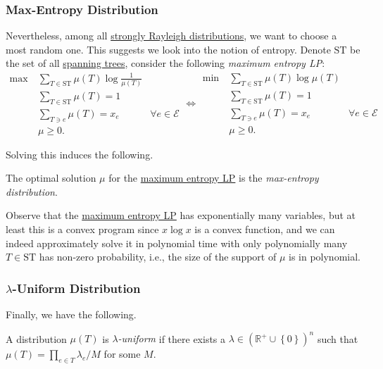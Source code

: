 \subsubsection{Max-Entropy Distribution}
Nevertheless, among all \hyperref[def:strongly-Rayleigh-distribution]{strongly Rayleigh distributions}, we want to choose a most random one. This suggests we look into the notion of entropy. Denote \(\mathrm{ST}\) be the set of all \hyperref[def:spanning-tree]{spanning trees}, consider the following \emph{maximum entropy LP}:
\begin{equation}\label{eq:max-entropy}
	\begin{aligned}
		\max~ & \sum_{T\in \mathrm{ST}} \mu (T) \log \frac{1}{\mu (T)}                            \\
		      & \sum_{T\in \mathrm{ST} } \mu (T) = 1                                              \\
		      & \sum_{T \ni e} \mu (T) = x_e                           & \forall e\in \mathcal{E} \\
		      & \mu \geq 0.
	\end{aligned} \iff
	\begin{aligned}
		\min~ & \sum_{T\in \mathrm{ST}} \mu (T) \log \mu (T)                            \\
		      & \sum_{T\in \mathrm{ST} } \mu (T) = 1                                    \\
		      & \sum_{T \ni e} \mu (T) = x_e                 & \forall e\in \mathcal{E} \\
		      & \mu \geq 0.
	\end{aligned}
\end{equation}

Solving this induces the following.
\begin{definition}\label{def:max-entropy-distribution}
	The optimal solution \(\mu \) for the \hyperref[eq:max-entropy]{maximum entropy LP} is the \emph{max-entropy distribution}.
\end{definition}

Observe that the \hyperref[eq:max-entropy]{maximum entropy LP} has exponentially many variables, but at least this is a convex program since \(x\log x\) is a convex function, and we can indeed approximately solve it in polynomial time with only polynomially many \(T\in \mathrm{ST} \) has non-zero probability, i.e., the size of the support of \(\mu\) is in polynomial.

\subsubsection{\(\lambda \)-Uniform Distribution}
Finally, we have the following.
\begin{definition}\label{def:lambda-uniform}
	A distribution \(\mu (T)\) is \emph{\(\lambda \)-uniform} if there exists a \(\lambda \in (\mathbb{R} ^+ \cup \left\{ 0 \right\} )^{n}\) such that \(\mu (T) = \prod_{e\in T} \lambda _e / M\) for some \(M\).
\end{definition}

